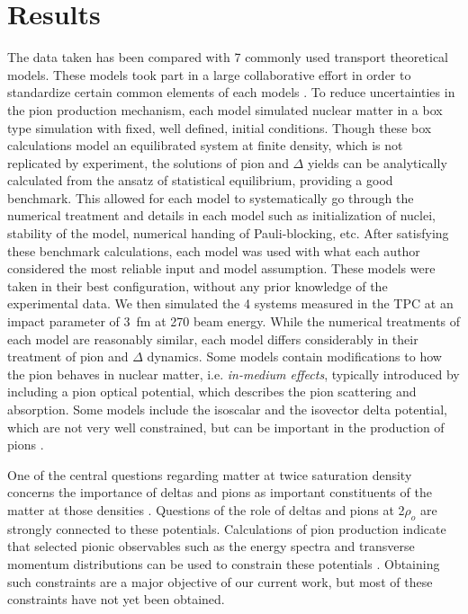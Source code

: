 \chapter{Results}
\label{chap:results}

 The data taken has been compared with 7 commonly used transport theoretical models. These models took part in a large collaborative effort in order to standardize certain common elements of each models \cite{theoryComp1,theoryComp2}. To reduce uncertainties in the pion production mechanism, each model simulated nuclear matter in a box type simulation with fixed, well defined, initial conditions. Though these box calculations model an equilibrated system at finite density, which is  not replicated by experiment, the solutions  of  pion and $\Delta$ yields can be analytically calculated from the ansatz of statistical equilibrium, providing a good benchmark. This allowed for each model to systematically go through the numerical treatment and details in each model such as initialization of nuclei, stability of the model, numerical handing of Pauli-blocking, etc. After satisfying these benchmark calculations, each model was used with what each author considered the most reliable input and model assumption.  These models were taken in their best configuration, without any prior knowledge of the experimental data. We then simulated the 4 systems measured in the \spirit TPC at an impact parameter of \SI{3}{\femto\metre} at \SI{270}{\MeVA} beam energy. While the numerical treatments of each model are reasonably similar, each model differs considerably in their treatment of pion and $\Delta$ dynamics. Some models contain modifications to how the pion behaves in nuclear matter, i.e. \emph{in-medium effects}, typically introduced by including a pion optical potential, which describes the pion scattering and absorption. Some models include the isoscalar and the isovector delta potential, which are not very well constrained, but can be important in the production of pions \cite{baoan_deltapotential,inmedPionKo,inmedPionFeng}. 


One of the central questions regarding matter at twice saturation density concerns the importance of deltas and pions as important constituents of the matter at those densities \cite{pionNS,deltaNS,awayforward}. Questions of the role of deltas and pions at 2$\rho_o$ are strongly connected to these potentials. Calculations of pion production indicate that selected pionic observables such as the energy spectra and transverse momentum distributions can be used to constrain these potentials \cite{cozmaPC}. Obtaining such constraints are a major objective of our current work, but most of these constraints have not yet been obtained.

